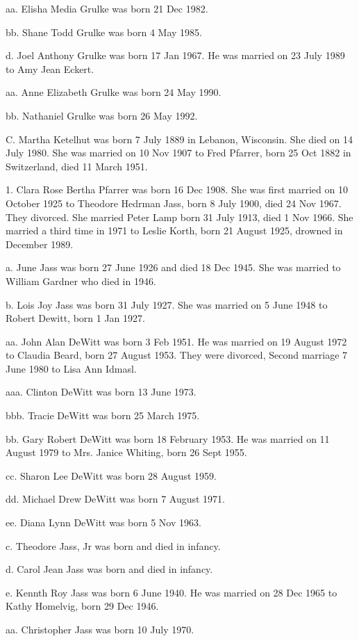 \documentclass[a4paper]{article}
\begin{document}
aa. Elisha Media Grulke was born 21 Dec 1982.

bb. Shane Todd Grulke was born 4 May 1985.

d. Joel Anthony Grulke was born 17 Jan 1967.  He was married on 23 July 1989 to Amy Jean Eckert.

aa. Anne Elizabeth Grulke was born 24 May 1990.

bb. Nathaniel Grulke was born 26 May 1992.

C. Martha Ketelhut was born 7 July 1889 in Lebanon, Wisconsin.  She died on 14 July 1980.  She was married on 10 Nov 1907 to Fred Pfarrer, born 25 Oct 1882 in Switzerland, died 11 March 1951. 

1. Clara Rose Bertha Pfarrer was born 16 Dec 1908.  She was first married on 10 October 1925 to Theodore Hedrman Jass, born 8 July 1900, died 24 Nov 1967.  They divorced.  She married Peter Lamp born 31 July 1913, died 1 Nov 1966.  She married a third time in 1971 to Leslie Korth, born 21 August 1925, drowned  in December 1989.  

a. June Jass was born 27 June 1926 and died 18 Dec 1945.  She was married to William Gardner who died in 1946.

b. Lois Joy Jass was born 31 July 1927.  She was married on 5 June 1948 to Robert Dewitt, born 1 Jan 1927.

aa. John Alan DeWitt was born 3 Feb 1951.  He was married on 19 August 1972 to Claudia Beard, born 27 August 1953.  They were divorced, Second marriage 7 June 1980 to Lisa Ann Idmasl.

aaa. Clinton DeWitt was born 13 June 1973.

bbb. Tracie DeWitt was born 25 March 1975.

bb. Gary Robert DeWitt was born 18 February 1953.  He was married on 11 August 1979 to Mrs. Janice Whiting, born 26 Sept 1955.  

cc. Sharon Lee DeWitt was born 28 August 1959.

dd. Michael Drew DeWitt was born 7 August 1971.

ee. Diana Lynn DeWitt was born 5 Nov 1963.  

c. Theodore Jass, Jr was born and died in infancy.

d. Carol Jean Jass was born and died in infancy.

e. Kennth Roy Jass was born 6 June 1940.  He was married on 28 Dec 1965 to Kathy Homelvig, born 29 Dec 1946.

aa. Christopher Jass was born 10 July 1970.
\end{document}
